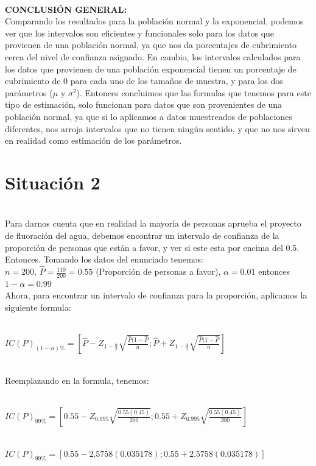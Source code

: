 \documentclass[letterpaper,12pt,onecolumn,titlepage]{article}
\begin{document}
~\\\textbf{CONCLUSI\'{O}N GENERAL:}
~\\ Comparando los resultados para la poblaci\'{o}n normal y la exponencial, podemos ver que los intervalos son eficientes y funcionales solo para los datos que provienen de una poblaci\'{o}n normal, ya que nos da porcentajes de cubrimiento cerca del nivel de confianza asignado. En cambio, los intervalos calculados para los datos que provienen de una poblaci\'{o}n exponencial tienen un porcentaje de cubrimiento de 0 para cada uno de los tama\~{n}os de muestra, y para los dos par\'{a}metros ($\mu$ y $\sigma^2$).
Entonces concluimos que las formulas que tenemos para este tipo de estimaci\'{o}n, solo funcionan para datos que son provenientes de una poblaci\'{o}n normal, ya que si lo aplicamos a datos muestreados de poblaciones diferentes, nos arroja intervalos que no tienen ning\'{u}n sentido, y que no nos sirven en realidad como estimaci\'{o}n de los par\'{a}metros.
\pagebreak\section{Situaci\'{o}n 2}
~\\ Para darnos cuenta que en realidad la mayor\'{i}a de personas aprueba el proyecto de fluoraci\'{o}n del agua, debemos encontrar un intervalo de confianza de la proporci\'{o}n de personas que est\'{a}n a favor, y ver si este esta por encima del 0.5.
~\\ Entonces. Tomando los datos del enunciado tenemos:
~\\ $n=200$, $\hat{P}=\frac{110}{200}=0.55$ (Proporci\'{o}n de personas a favor), $\alpha=0.01$ entonces $1-\alpha=0.99$
~\\ Ahora, para encontrar un intervalo de confianza para la proporci\'{o}n, aplicamos la siguiente formula:

~\\ $IC(P)_{(1-\alpha)\%}=\left[\hat{P}-Z_{1-\frac{\alpha}{2}}\sqrt{\frac{\hat{P}(1-\hat{P}}{n}};\hat{P}+Z_{1-\frac{\alpha}{2}}\sqrt{\frac{\hat{P}(1-\hat{P}}{n}}\right]$

~\\ Reemplazando en la formula, tenemos:

~\\ $IC(P)_{99\%}=\left[0.55-Z_{0.995}\sqrt{\frac{0.55(0.45)}{200}};0.55+Z_{0.995}\sqrt{\frac{0.55(0.45)}{200}}\right]$

~\\ $IC(P)_{99\%}=[0.55-2.5758(0.035178) ; 0.55+2.5758(0.035178)]$
\end{document}
